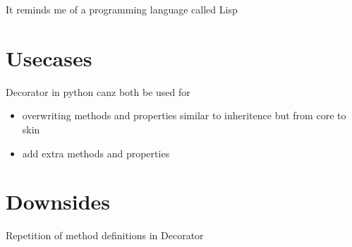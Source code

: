 It reminds me of a programming language called Lisp \textbf{}

\section{Usecases}
Decorator in python canz both be used for
\begin{itemize}
    \item overwriting methods and properties similar to inheritence but from core to skin
    \item add extra methods and properties
\end{itemize}

\section{Downsides}
Repetition of method definitions in Decorator